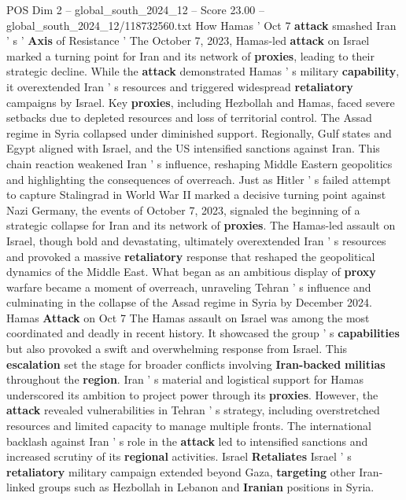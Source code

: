 \begin{textsample}{POS Dim 2 – global\_south\_2024\_12 – Score 23.00 – global\_south\_2024\_12/118732560.txt}  \label{ex:f2_pos_202}
How Hamas ' Oct 7 \textbf{attack} smashed Iran ' s ' \textbf{Axis} of Resistance ' The October 7, 2023, Hamas-led \textbf{attack} on Israel marked a turning point for Iran and its network of \textbf{proxies}, leading to their strategic decline.
While the \textbf{attack} demonstrated Hamas ' s military \textbf{capability}, it overextended Iran ' s resources and triggered widespread \textbf{retaliatory} campaigns by Israel.
Key \textbf{proxies}, including Hezbollah and Hamas, faced severe setbacks due to depleted resources and loss of territorial control.
The Assad regime in Syria collapsed under diminished support.
Regionally, Gulf states and Egypt aligned with Israel, and the US intensified sanctions against Iran.
This chain reaction weakened Iran ' s influence, reshaping Middle Eastern geopolitics and highlighting the consequences of overreach.
Just as Hitler ' s failed attempt to capture Stalingrad in World War II marked a decisive turning point against Nazi Germany, the events of October 7, 2023, signaled the beginning of a strategic collapse for Iran and its network of \textbf{proxies}.
The Hamas-led assault on Israel, though bold and devastating, ultimately overextended Iran ' s resources and provoked a massive \textbf{retaliatory} response that reshaped the geopolitical dynamics of the Middle East.
What began as an ambitious display of \textbf{proxy} warfare became a moment of overreach, unraveling Tehran ' s influence and culminating in the collapse of the Assad regime in Syria by December 2024.
Hamas \textbf{Attack} on Oct 7 The Hamas assault on Israel was among the most coordinated and deadly in recent history.
It showcased the group ' s \textbf{capabilities} but also provoked a swift and overwhelming response from Israel.
This \textbf{escalation} set the stage for broader conflicts involving \textbf{Iran-backed} \textbf{militias} throughout the \textbf{region}.
Iran ' s material and logistical support for Hamas underscored its ambition to project power through its \textbf{proxies}.
However, the \textbf{attack} revealed vulnerabilities in Tehran ' s strategy, including overstretched resources and limited capacity to manage multiple fronts.
The international backlash against Iran ' s role in the \textbf{attack} led to intensified sanctions and increased scrutiny of its \textbf{regional} activities.
Israel \textbf{Retaliates} Israel ' s \textbf{retaliatory} military campaign extended beyond Gaza, \textbf{targeting} other Iran-linked groups such as Hezbollah in Lebanon and \textbf{Iranian} positions in Syria.

\end{textsample}
